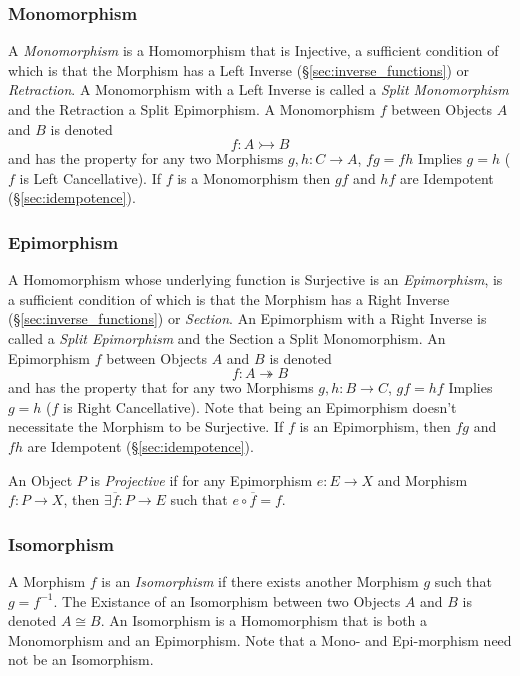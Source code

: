 \subsubsection{Monomorphism}\label{sec:monomorphism}

A \emph{Monomorphism} is a Homomorphism that is Injective, a
sufficient condition of which is that the Morphism has a Left Inverse
(\S\ref{sec:inverse_functions}) or \emph{Retraction}. A
Monomorphism with a Left Inverse is called a \emph{Split Monomorphism}
and the Retraction a Split Epimorphism. A Monomorphism $f$ between
Objects $A$ and $B$ is denoted
\[
    f : A \rightarrowtail B
\]
and has the property for any two Morphisms $g, h : C \rightarrow A$,
$fg = fh$ Implies $g = h$ ($f$ is Left Cancellative). If $f$ is a
Monomorphism then $gf$ and $hf$ are Idempotent
(\S\ref{sec:idempotence}).



\subsubsection{Epimorphism}\label{sec:epimorphism}

A Homomorphism whose underlying function is Surjective is an
\emph{Epimorphism}, is a sufficient condition of which is that the
Morphism has a Right Inverse (\S\ref{sec:inverse_functions}) or
\emph{Section}. An Epimorphism with a Right Inverse is called a
\emph{Split Epimorphism} and the Section a Split Monomorphism. An
Epimorphism $f$ between Objects $A$ and $B$ is denoted
\[
    f : A \twoheadrightarrow B
\]
and has the property that for any two Morphisms $g, h : B \rightarrow
C$, $gf = hf$ Implies $g = h$ ($f$ is Right Cancellative). Note that
being an Epimorphism doesn't necessitate the Morphism to be
Surjective. If $f$ is an Epimorphism, then $fg$ and $fh$ are
Idempotent (\S\ref{sec:idempotence}).

An Object $P$ is \emph{Projective} if for any Epimorphism $e : E
\rightarrow X$ and Morphism $f : P \rightarrow X$, then $\exists
\overline{f} : P \rightarrow E$ such that $e \circ \overline{f} = f$.



\subsubsection{Isomorphism}\label{sec:isomorphism}

A Morphism $f$ is an \emph{Isomorphism} if there exists another
Morphism $g$ such that $g = f^{-1}$. The Existance of an Isomorphism
between two Objects $A$ and $B$ is denoted $A \cong B$. An Isomorphism
is a Homomorphism that is both a Monomorphism and an Epimorphism. Note
that a Mono- and Epi-morphism need not be an Isomorphism.

